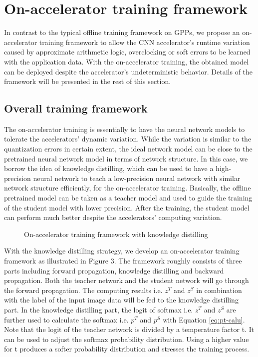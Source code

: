 \section{On-accelerator training framework} \label{sec:framework}
In contrast to the typical offline training framework on GPPs, we propose an 
on-accelerator training framework to allow the CNN accelerator's runtime variation 
caused by approximate arithmetic logic, overclocking or soft errors 
to be learned with the application data. With the on-accelerator training,
the obtained model can be deployed despite the accelerator's 
undeterministic behavior. Details of the framework will be presented in 
the rest of this section.

\subsection{Overall training framework}
The on-accelerator training is essentially to have the neural 
network models to tolerate the accelerators' dynamic variation. 
While the variation is similar to the quantization 
errors in certain extent, the ideal network model can be 
close to the pretrained neural network model in terms of 
network structure. In this case, we borrow the idea of knowledge 
distilling\cite{distillation_38, distillation_39}, 
which can be used to have a high-precision neural network to teach a 
low-precision neural network with similar network structure efficiently, 
for the on-accelerator training. Basically, the offline pretrained 
model can be taken as a teacher model and used to guide the training of the 
student model with lower precision. After the training, the student model 
can perform much better despite the accelerators' computing variation.

\begin{figure*}
        \caption{On-accelerator training framework with knowledge distilling}
        \label{fig:retrain}
\end{figure*}


With the knowledge distilling strategy, we develop an on-accelerator training 
framework as illustrated in Figure 3. The framework roughly consists of three parts
including forward propagation, knowledge distilling and backward propagation. 
Both the teacher network and the student network will go through the 
forward propagation. The computing results i.e. $z^T$ and $z^S$ in 
combination with the label of the input image data will be fed to the 
knowledge distilling part. In the knowledge distilling part,  
the logit of softmax i.e. $z^T$ and $z^S$ are further used to calculate the 
softmax i.e. $p^T$ and $p^S$ with Equation \ref{eq:pt-calu}. 
Note that the logit of the teacher network is divided by a 
temperature factor t. It can be used to adjust the softmax 
probability distribution. Using a higher value for t 
produces a softer probability distribution and stresses 
the training process. 

